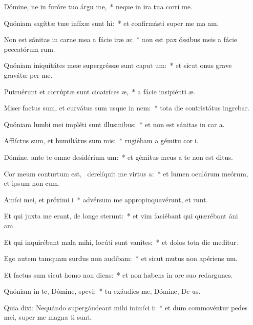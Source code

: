 \item Dómine, ne in furóre tuo árgu me,~* neque in ira tua corrí me.
\item Quóniam sagíttæ tuæ infíxæ sunt hi:~* et confirmásti super me ma am.
\item Non est sánitas in carne mea a fácie iræ æ:~* non est pax óssibus meis a fácie peccatórum rum.
\item Quóniam iniquitátes meæ supergréssæ sunt caput um:~* et sicut onus grave gravátæ  per me.
\item Putruérunt et corrúptæ sunt cicatríces æ,~* a fácie insipiénti æ.
\item Miser factus sum, et curvátus sum usque in nem:~* tota die contristátus ingrebar.
\item Quóniam lumbi mei impléti sunt illusinibus:~* et non est sánitas in car a.
\item Afflíctus sum, et humiliátus sum mis:~* rugiébam a gémitu cor i.
\item Dómine, ante te omne desidérium um:~* et gémitus meus a te non est ditus.
\item Cor meum conturtum est,~\pscross{} derelíquit me virtus a:~* et lumen oculórum meórum, et ipsum non  cum.
\item Amíci mei, et próximi i~* advérsum me appropinquavérunt, et runt.
\item Et qui juxta me erant, de longe sterunt:~* et vim faciébant qui quærébant áni am.
\item Et qui inquirébant mala mihi, locúti sunt vanites:~* et dolos tota die meditur.
\item Ego autem tamquam surdus non audibam:~* et sicut mutus non apériens  um.
\item Et factus sum sicut homo non diens:~* et non habens in ore suo redargunes.
\item Quóniam in te, Dómine, spevi:~* tu exáudies me, Dómine, De us.
\item Quia dixi: Nequándo supergáudeant mihi inimíci i:~* et dum commovéntur pedes mei, super me magna ti sunt.

